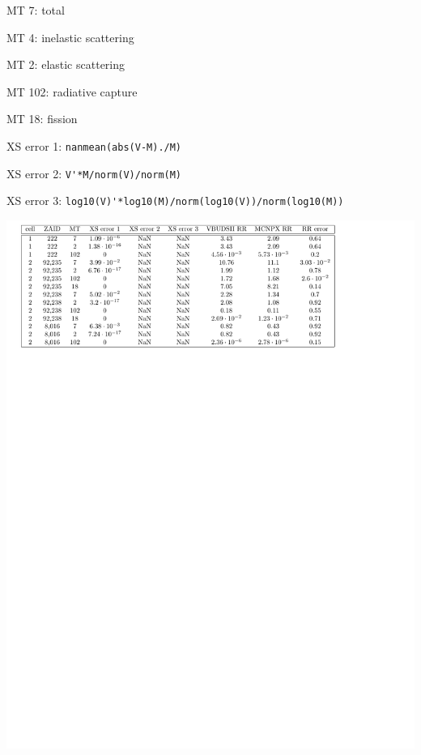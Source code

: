 \documentclass[letterpaper,12pt]{article}
\begin{document}
MT 7: total 

MT 4: inelastic scattering 

MT 2: elastic scattering 

MT 102: radiative capture 

MT 18: fission

XS error 1: \verb|nanmean(abs(V-M)./M)|

XS error 2: \verb|V'*M/norm(V)/norm(M)|

XS error 3: \verb|log10(V)'*log10(M)/norm(log10(V))/norm(log10(M))|

\includegraphics{mcnpxsimplanterrortable.pdf}
\end{document}
